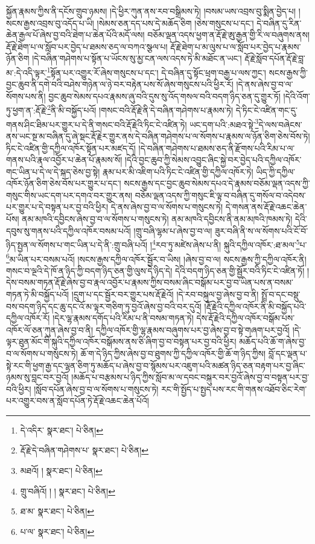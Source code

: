 སྐྱོན་རྣམས་ཀྱིས་ནི་དངོས་གྲུབ་ཉམས། །དེ་ཕྱིར་ཀུན་ནས་རབ་བསྒྲིམས་ཏེ། །བསམ་ཡས་འབྲས་བུ་སྨིན་བྱེད་པ། །སངས་རྒྱས་འབྲས་བུ་འདོད་པ་ཡི། །སེམས་ཅན་དད་པས་དེ་མཆོད་ཅིག །ཅེས་གསུངས་པ་དང་། དེ་བཞིན་དུ་རིན་ཆེན་རྒྱལ་པོ་ཞེས་བྱ་བའི་ཐེག་པ་ཆེན་པོའི་མདོ་ལས། བཅོམ་ལྡན་འདས་ཕྱག་ན་རྡོ་རྗེ་ཨུ་རྒྱན་གྱི་རི་ལ་བཞུགས་ནས། རྡོ་རྗེ་ཐེག་པ་ལ་སློབ་པར་བྱེད་པ་ཐམས་ཅད་ལ་བཀའ་སྩལ་པ། རྡོ་རྗེ་ཐེག་པ་མ་ལུས་པ་ལ་སློབ་པར་བྱེད་པ་རྣམས་ཉོན་ཅིག །དེ་བཞིན་གཤེགས་པ་སྟོན་པ་ཡོངས་སུ་མྱ་ངན་ལས་འདས་ཏེ་མི་མཐོང་ན་ཡང་། རྡོ་རྗེ་སློབ་དཔོན་རྡོ་རྗེ་བླ་མ་:དེ་འདི་ལྟར་\footnote{དེ་འདིར་  སྣར་ཐང་།  པེ་ཅིན། }སྟོན་པར་འགྱུར་རོ་ཞེས་གསུངས་པ་དང་། དེ་བཞིན་དུ་སྟོང་ཕྲག་བརྒྱ་པ་ལས་ཀྱང་། སངས་རྒྱས་ཀྱི་བྱང་ཆུབ་ནི་དགེ་བའི་བཤེས་གཉེན་ལ་ཉེ་བར་བརྟེན་པས་སོ་ཞེས་གསུངས་པའི་ཕྱིར་རོ། །དེ་ནས་ཞེས་བྱ་བ་ལ་སོགས་པས་ནི། བྱང་ཆུབ་སེམས་དཔའ་རྣམས་ཞུ་བའི་དུས་སུ་འོད་གསལ་བའི་བདག་ཉིད་ཅན་དུ་གྱུར་ཏོ། །དེའི་འོག་ཏུ་ཕྱག་ན་:རྡོ་རྗེ་\footnote{རྡོ་རྗེ་དེ་བཞིན་གཤེགས་པ་  སྣར་ཐང་།  པེ་ཅིན། }ནི་མི་བསྐྱོད་པའོ། །གསང་བའི་རྡོ་རྗེ་ནི་དེ་བཞིན་གཤེགས་པ་རྣམས་ཏེ། དེ་ཏིང་ངེ་འཛིན་གང་དུ་གནས་ཤིང་ཐིམ་པར་གྱུར་པ་དེ་ནི་གསང་བའི་རྡོ་རྗེའི་ཏིང་ངེ་འཛིན་ཏེ། ཡང་དག་པའི་:མཐའ་སྟེ་\footnote{མཐའོ། །  སྣར་ཐང་།  པེ་ཅིན། }དེ་ལས་བཞེངས་ནས་ཡང་སྔ་མ་བཞིན་དུ་ཞེ་སྡང་རྡོ་རྗེར་གྱུར་ནས་དེ་བཞིན་གཤེགས་པ་ལ་སོགས་པ་རྣམས་ལ་ཉོན་ཅིག་ཅེས་བོས་ཏེ། ཏིང་ངེ་འཛིན་གྱི་དཀྱིལ་འཁོར་སྟོན་པར་མཛད་དོ། །དེ་བཞིན་གཤེགས་པ་ཐམས་ཅད་ནི་རྫོགས་པའི་རིམ་པ་ལ་གནས་པའི་རྣལ་འབྱོར་པ་ཆེན་པོ་རྣམས་སོ། །དེའི་བྱང་ཆུབ་ཀྱི་སེམས་འབྱུང་ཞིང་སྐྱེ་བར་བྱེད་པའི་དཀྱིལ་འཁོར་གང་ཡིན་པ་དེ་ལ་དེ་སྐད་ཅེས་བྱ་སྟེ། རྣམ་པར་མི་འཇིག་པའི་ཏིང་ངེ་འཛིན་གྱི་དཀྱིལ་འཁོར་ཏེ། ཡིད་ཀྱི་དཀྱིལ་འཁོར་ཉོན་ཅིག་ཅེས་བོས་པར་གྱུར་པ་དང་། སངས་རྒྱས་དང་བྱང་ཆུབ་སེམས་དཔའ་དེ་རྣམས་བཅོམ་ལྡན་འདས་ཀྱི་གསུང་གིས་ཡང་དག་པར་དགའ་བར་གྱུར་ནས། བཅོམ་ལྡན་འདས་ཀྱི་གསུང་ཇི་ལྟ་བ་བཞིན་དུ་གསོལ་བ་འདེབས་པར་གྱུར་པ་དེ་བསྟན་པར་བྱ་བའི་ཕྱིར། དེ་ནས་ཞེས་བྱ་བ་ལ་སོགས་པ་གསུངས་ཏེ། དེ་གསན་ནས་རྡོ་རྗེ་འཆང་ཆེན་པོས། ནམ་མཁའི་དབྱིངས་ཞེས་བྱ་བ་ལ་སོགས་པ་གསུངས་ཏེ། ནམ་མཁའི་དབྱིངས་ནི་ནམ་མཁའི་ཁམས་ཏེ། དེའི་དབུས་སུ་གནས་པའི་དཀྱིལ་འཁོར་བསམ་པའོ། །གྲུ་བཞི་ལྷམ་པ་ཞེས་བྱ་བ་ལ། ཟུར་བཞི་ནི་ས་ལ་སོགས་པའི་ངོ་བོ་ཉིད་སྤྱན་ལ་སོགས་པ་གང་ཡིན་པ་དེ་ནི་:གྲུ་བཞི་པའོ། །\footnote{གྲུ་བཞིའོ། ། །  སྣར་ཐང་།  པེ་ཅིན། }རབ་ཏུ་མཛེས་ཞེས་པ་ནི། སྐུའི་དཀྱིལ་འཁོར་:ཐ་མལ་\footnote{ཐ་མ་  སྣར་ཐང་།  པེ་ཅིན། }པ་\footnote{པ་ལ་  སྣར་ཐང་།  པེ་ཅིན། }མ་ཡིན་པར་བསམ་པའོ། །སངས་རྒྱས་དཀྱིལ་འཁོར་སྦྱོར་བ་ཡིས། །ཞེས་བྱ་བ་ལ། སངས་རྒྱས་ཀྱི་དཀྱིལ་འཁོར་ནི། གསང་བ་ལྔའི་དེ་ཁོ་ན་ཉིད་ཀྱི་བདག་ཉིད་ཅན་གྱི་ལུས་དེ་ཉིད་དེ། དེའི་བདག་ཉིད་ཅན་གྱི་སྦྱོར་བའི་ཏིང་ངེ་འཛིན་ཏོ། །དེས་བསམ་གཏན་རྡོ་རྗེ་ཞེས་བྱ་བ་རྣལ་འབྱོར་པ་རྣམས་ཀྱིས་བསམ་ཞིང་བསྒོམ་པར་བྱ་བ་ཡིན་པས་ན་བསམ་གཏན་ཏེ་མི་བསྐྱོད་པའོ། །དྲུག་པ་དང་སྦྱོར་བར་གྱུར་པས་རྡོ་རྗེའོ། །དེ་རབ་བསྐུལ་བྱ་ཞེས་བྱ་བ་ནི། སྤྲོ་བ་དང་བསྡུ་བས་བདག་ཉིད་དང་ཆུ་དང་འོ་མ་ལྟར་གཅིག་ཏུ་བྱའོ་ཞེས་བྱ་བའི་བར་དུའོ། །རྡོ་རྗེའི་དཀྱིལ་འཁོར་ནི་མི་བསྐྱོད་པའི་དཀྱིལ་འཁོར་རོ། །དེར་ལྷ་རྣམས་དགོད་པའི་རིམ་པ་ནི་བསམ་གཏན་ཏེ། དེས་རྡོ་རྗེའི་དཀྱིལ་འཁོར་བསྒོམ་པས་འཁོར་ལོ་ཅན་ཀུན་ཞེས་བྱ་བ་ནི། དཀྱིལ་འཁོར་གྱི་ལྷ་རྣམས་བཞུགས་པར་བྱ་ཞེས་བྱ་བ་སྟེ་གཞག་པར་བྱའོ། །དེ་ལྟར་ཐུན་མོང་གི་སྐུའི་དཀྱིལ་འཁོར་བསྒོམས་ནས་ཅི་ཞིག་བྱ་བ་བསྟན་པར་བྱ་བའི་ཕྱིར། མཆོད་པའི་ཆོ་ག་ཞེས་བྱ་བ་ལ་སོགས་པ་གསུངས་ཏེ། ཆོ་ག་དེ་ཉིད་ཀྱིས་ཞེས་བྱ་བ་ཐུགས་ཀྱི་དཀྱིལ་འཁོར་གྱི་ཆོ་ག་ཉིད་ཀྱིས། བློ་དང་ལྡན་པ་སྟེ་རང་གི་ཕྱག་རྒྱ་དང་ལྷན་ཅིག་ཏུ་མཆོད་པ་ཞེས་བྱ་བ་སྙོམས་པར་འཇུག་པའི་མཚན་ཉིད་ཅན་བརྟག་པར་བྱ་ཞིང་ཉམས་སུ་བླང་བར་བྱའོ། །མཆོད་པ་བརྩམས་པ་ཉིད་ཀྱིས་སློབ་མ་ལ་དབང་བསྐུར་བར་བྱའོ་ཞེས་བྱ་བ་བསྟན་པར་བྱ་བའི་ཕྱིར། །སློབ་དཔོན་ཞེས་བྱ་བ་ལ་སོགས་པ་གསུངས་ཏེ། རང་གི་སྤྱོད་པ་སྤྱད་པས་རང་གི་གནས་འཐོབ་ཅིང་རེག་པར་འགྱུར་བས་ན་སློབ་དཔོན་ཏེ་རྡོ་རྗེ་འཆང་ཆེན་པོའོ། 